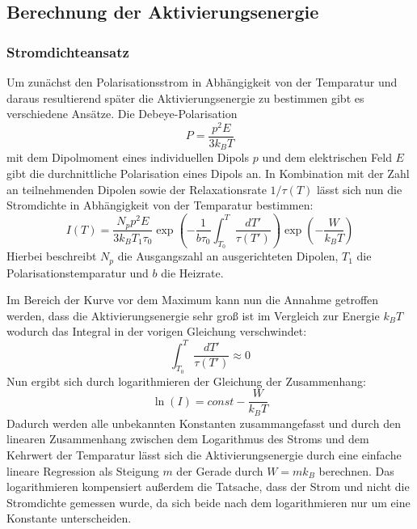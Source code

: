 \subsection{Berechnung der Aktivierungsenergie}
\subsubsection{Stromdichteansatz}
Um zunächst den Polarisationsstrom in Abhängigkeit von der Temparatur und daraus resultierend später die Aktivierungsenergie zu bestimmen gibt es verschiedene Ansätze. Die Debeye-Polarisation
\begin{equation*}
P=\frac{p^2E}{3k_BT}
\end{equation*}
mit dem Dipolmoment eines individuellen Dipols $p$ und dem elektrischen Feld $E$ gibt die durchnittliche Polarisation eines Dipols an. In Kombination mit der Zahl an teilnehmenden Dipolen sowie der Relaxationsrate $1/\tau(T)$ lässt sich nun die Stromdichte in Abhängigkeit von der Temparatur bestimmen:
\begin{equation}
I(T)=\frac{N_pp^2E}{3k_BT_1\tau_0}\exp \left( -\frac{1}{b\tau_0}\int^{T}_{T_0} \frac{dT'}{\tau(T')}\right)\exp\left(-\frac{W}{k_BT}\right)
\label{eq:IStromdichteansatz}
\end{equation}
Hierbei beschreibt $N_p$ die Ausgangszahl an ausgerichteten Dipolen, $T_1$ die Polarisationstemparatur und $b$ die Heizrate. 

Im Bereich der Kurve vor dem Maximum kann nun die Annahme getroffen werden, dass die Aktivierungsenergie sehr groß ist im Vergleich zur Energie $k_BT$ wodurch das Integral in der vorigen Gleichung verschwindet:
\begin{equation*}
 \int^{T}_{T_0} \frac{dT'}{\tau(T')}\approx 0
\end{equation*}
Nun ergibt sich durch logarithmieren der Gleichung der Zusammenhang:
\begin{equation}
\ln(I)=const-\frac{W}{k_BT}
\label{equ:1}
\end{equation}
Dadurch werden alle unbekannten Konstanten zusammangefasst und durch den linearen Zusammenhang zwischen dem Logarithmus des Stroms und dem Kehrwert der Temparatur lässt sich die Aktivierungsenergie durch eine einfache lineare Regression als Steigung $m$ der Gerade durch $W=mk_B$ berechnen. Das logarithmieren kompensiert außerdem die Tatsache, dass der Strom und nicht die Stromdichte gemessen wurde, da sich beide nach dem logarithmieren nur um eine Konstante unterscheiden.
